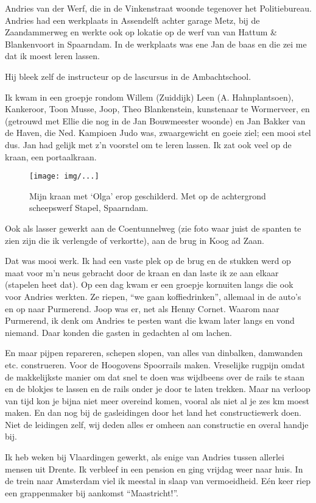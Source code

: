 \documentclass[10pt,twoside,openright]{memoir}
\begin{document}
Andries van der Werf, die in de Vinkenstraat woonde tegenover het Politiebureau. Andries had een werkplaats in Assendelft achter garage Metz, bij de Zaandammerweg en werkte ook op lokatie op de werf van van Hattum \& Blankenvoort in Spaarndam. In de werkplaats was ene Jan de baas en die zei me dat ik moest leren lassen. 

Hij bleek zelf de instructeur op de lascursus in de Ambachtschool. 

Ik kwam in een groepje rondom Willem (Zuiddijk) Leen (A. Hahnplantsoen), Kankeroor, Toon Musse, Joop, Theo Blankenstein, kunstenaar te Wormerveer, en (getrouwd met Ellie die nog in de Jan Bouwmeester woonde) en Jan Bakker van de Haven, die Ned. Kampioen Judo was, zwaargewicht en goeie ziel; een mooi stel dus. Jan had gelijk met z’n voorstel om te leren lassen. Ik zat ook veel op de kraan, een portaalkraan. 

\begin{figure}[t]
\texttt{[image: img/...]}
\caption{Mijn kraan met ‘Olga’ erop geschilderd. Met op de achtergrond scheepswerf Stapel, Spaarndam.}
\end{figure}

Ook als lasser gewerkt aan de Coentunnelweg (zie foto waar juist de spanten te zien zijn die ik verlengde of verkortte), aan de brug in Koog ad Zaan. 

Dat was mooi werk. Ik had een vaste plek op de brug en de stukken werd op maat voor m’n neus gebracht door de kraan en dan laste ik ze aan elkaar (stapelen heet dat). Op een dag kwam er een groepje kornuiten langs die ook voor Andries werkten. Ze riepen, ``we gaan koffiedrinken'', allemaal in de auto’s en op naar Purmerend. Joop was er, net als Henny Cornet. Waarom naar Purmerend, ik denk om Andries te pesten want die kwam later langs en vond niemand. Daar konden die gasten in gedachten al om lachen.

En maar pijpen repareren, schepen slopen, van alles van dinbalken, damwanden etc. construeren. Voor de Hoogovens Spoorrails maken. Vreselijke rugpijn omdat de makkelijkste manier om dat snel te doen was wijdbeens over de rails te staan en de blokjes te lassen en de rails onder je door te laten trekken. Maar na verloop van tijd kon je bijna niet meer overeind komen, vooral als niet al je zes km moest maken. En dan nog bij de gasleidingen door het land het constructiewerk doen. Niet de leidingen zelf, wij deden alles er omheen aan constructie en overal handje bij.

Ik heb weken bij Vlaardingen gewerkt, als enige van Andries tussen allerlei mensen uit Drente. Ik verbleef in een pension en ging vrijdag weer naar huis. In de trein naar Amsterdam viel ik meestal in slaap van vermoeidheid. Eén keer riep een grappenmaker bij aankomst ``Maastricht!''. 
\end{document}
